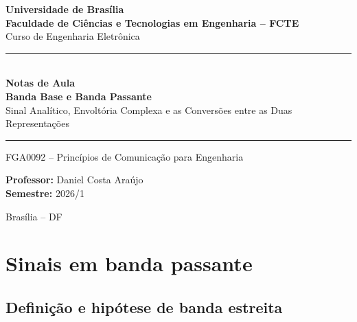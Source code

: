 \documentclass[11pt,a4paper]{article}
\begin{document}
\begin{titlepage}
\thispagestyle{empty}
\centering

\vspace*{1.5cm}

{\large\textbf{Universidade de Brasília}}\\[0.15cm]
{\large\textbf{Faculdade de Ciências e Tecnologias em Engenharia -- FCTE}}\\[0.15cm]
{\normalsize Curso de Engenharia Eletrônica}\\[1.8cm]

\rule{\textwidth}{1pt}\\[0.5cm]
{\Huge\textbf{Notas de Aula}}\\[0.5cm]
{\LARGE\textbf{Banda Base e Banda Passante}}\\[0.4cm]
{\large Sinal Analítico, Envoltória Complexa e as Conversões entre as Duas Representações}\\[0.5cm]
\rule{\textwidth}{1pt}

\vspace{2.5cm}

{\large FGA0092 -- Princípios de Comunicação para Engenharia}

\vfill

\begin{flushleft}
\large
\textbf{Professor:} Daniel Costa Araújo\\[0.3cm]
\textbf{Semestre:} 2026/1
\end{flushleft}

\vspace{1cm}

{\large Brasília -- DF}

\end{titlepage}

\newpage
\tableofcontents
\newpage

\section{Sinais em banda passante}

\subsection{Definição e hipótese de banda estreita}
\end{document}
